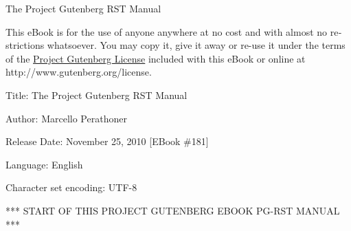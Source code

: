 \documentclass[a5paper]{book}
\begin{document}
\begin{german}
\begin{center}
{\noindent}The Project Gutenberg RST Manual
\end{center}

\label{pg-header}%
\hypertarget{pg-header}{}%
{}

\vspace{2em}
\begin{english}
\begin{pgheader_env}
\begin{container}
\noindent
This eBook is for the use of anyone anywhere at no cost and with
almost no restrictions whatsoever. You may copy it, give it away or
re-use it under the terms of the \hyperlink{project-gutenberg-license}{Project Gutenberg License}
included with this eBook or online at
{http://www.gutenberg.org/license}.\par

\vspace{1em}
\label{pg-machine-header}%
\hypertarget{pg-machine-header}{}%
{}

\begin{container}
\noindent
Title: The Project Gutenberg RST Manual\par

\noindent
Author: Marcello Perathoner\par

\noindent
Release Date: November 25, 2010 {[}EBook \#181{]}\par

\noindent
Language: English\par

\noindent
Character set encoding: UTF-8\par

\vspace{1em}
\label{pg-start-line}%
\hypertarget{pg-start-line}{}%
{}

\noindent
*** START OF THIS PROJECT GUTENBERG EBOOK PG-RST MANUAL ***\par
\end{container}

\vspace{4em}
\label{pg-produced-by}%
\hypertarget{pg-produced-by}{}%
{}

\begin{container}
\vspace{1em}
\end{container}
\end{container}
\end{pgheader_env}
\end{english}


\end{german}
\end{document}
